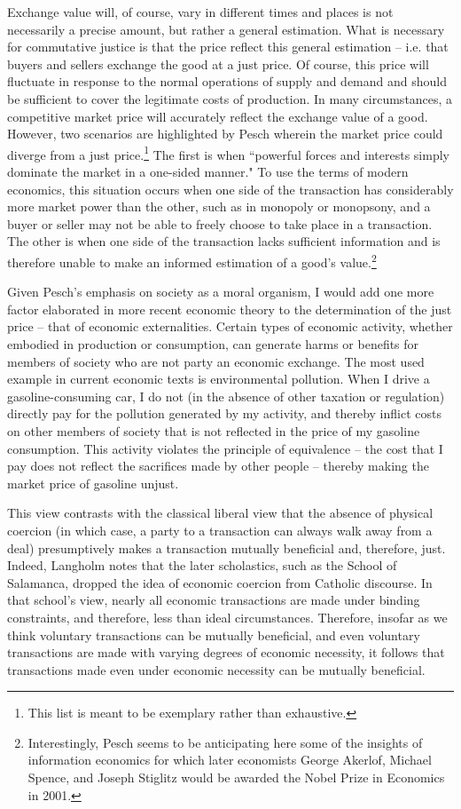 \documentclass{article}
\begin{document}
Exchange value will, of course, vary in different times and places is not necessarily a precise amount, but rather a general estimation.  What is necessary for commutative justice is that the price reflect this general estimation – i.e. that buyers and sellers exchange the good at a just price.  Of course, this price will fluctuate in response to the normal operations of supply and demand and should be sufficient to cover the legitimate costs of production.  In many circumstances, a competitive market price will accurately reflect the exchange value of a good.  However, two scenarios are highlighted by Pesch wherein the market price could diverge from a just price.\footnote{This list is meant to be exemplary rather than exhaustive.}  The first is when ``powerful forces and interests simply dominate the market in a one-sided manner." \citep[p. 221]{pesch1998}  To use the terms of modern economics, this situation occurs when one side of the transaction has considerably more market power than the other, such as in monopoly or monopsony, and a buyer or seller may not be able to freely choose to take place in a transaction.  The other is when one side of the transaction lacks sufficient information and is therefore unable to make an informed estimation of a good’s value.\footnote{Interestingly, Pesch seems to be anticipating here some of the insights of information economics for which later economists George Akerlof, Michael Spence, and Joseph Stiglitz would be awarded the Nobel Prize in Economics in 2001.}\medskip

Given Pesch’s emphasis on society as a moral organism, I would add one more factor elaborated in more recent economic theory to the determination of the just price – that of economic externalities.  Certain types of economic activity, whether embodied in production or consumption, can generate harms or benefits for members of society who are not party an economic exchange.  The most used example in current economic texts is environmental pollution.  When I drive a gasoline-consuming car, I do not (in the absence of other taxation or regulation) directly pay for the pollution generated by my activity, and thereby inflict costs on other members of society that is not reflected in the price of my gasoline consumption.  This activity violates the principle of equivalence – the cost that I pay does not reflect the sacrifices made by other people – thereby making the market price of gasoline unjust.\medskip

This view contrasts with the classical liberal view that the absence of physical coercion (in which case, a party to a transaction can always walk away from a deal) presumptively makes a transaction mutually beneficial and, therefore, just.  Indeed, Langholm notes that the later scholastics, such as the School of Salamanca, dropped the idea of economic coercion from Catholic discourse.  In that school’s view, nearly all economic transactions are made under binding constraints, and therefore, less than ideal circumstances.  Therefore, insofar as we think voluntary transactions can be mutually beneficial, and even voluntary transactions are made with varying degrees of economic necessity, it follows that transactions made even under economic necessity can be mutually beneficial.\medskip
\end{document}
